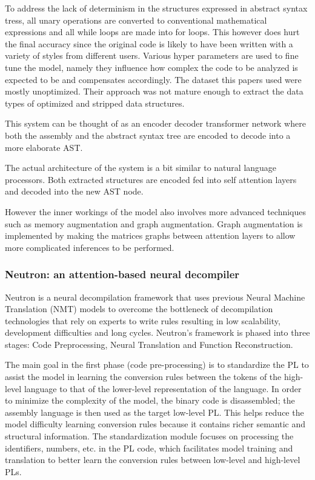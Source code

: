 \documentclass[conference,a4paper]{IEEEtran}
\begin{document}
To address the lack of determinism in the structures expressed in abstract syntax tress, all unary operations are converted to conventional mathematical expressions and all while loops are made into for loops.
This however does hurt the final accuracy since the original code is likely to have been written with a variety of styles from different users.
Various hyper parameters are used to fine tune the model, namely they influence how complex the code to be analyzed is expected to be and compensates accordingly.
The dataset this papers used were mostly unoptimized. Their approach was not mature enough to extract the data types of optimized and stripped data structures.

This system can be thought of as an encoder decoder transformer network where both the assembly and the abstract syntax tree are encoded to decode into a more elaborate AST.

The actual architecture of the system is a bit similar to natural language processors.
Both extracted structures are encoded fed into self attention layers and decoded into the new AST node.

However the inner workings of the model also involves more advanced techniques such as memory augmentation and graph augmentation.
Graph augmentation is implemented by making the matrices graphs between attention layers to allow more complicated inferences to be performed.

\subsubsection{Neutron: an attention-based neural decompiler}

Neutron is a neural decompilation framework that uses previous Neural Machine Translation (NMT) models to overcome the bottleneck of decompilation technologies that rely on experts to write rules resulting in low scalability, development difficulties and long cycles. Neutron’s framework is phased into three stages: Code Preprocessing, Neural Translation and Function Reconstruction.

The main goal in the first phase (code pre-processing) is to standardize the PL to assist the model in learning the conversion rules between the tokens of the high-level language to that of the lower-level representation of the language. In order to minimize the complexity of the model, the binary code is disassembled; the assembly language is then used as the target low-level PL. This helps reduce the model difficulty learning conversion rules because it contains richer semantic and structural information. The standardization module focuses on processing the identifiers, numbers, etc. in the PL code, which facilitates model training and translation to better learn the conversion rules between low-level and high-level PLs.
\end{document}
